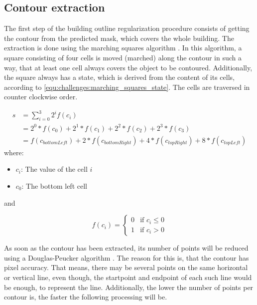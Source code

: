 \subsection{Contour extraction}
The first step of the building outline regularization procedure consists of getting the contour from the predicted mask, which covers the whole building. The extraction is done using the marching squares algorithm \cite{Maple.2003}. In this algorithm, a square consisting of four cells is moved (marched) along the contour in such a way, that at least one cell always covers the object to be contoured. Additionally, the square always has a state, which is derived from the content of its cells, according to \eqref{equ:challenges:marching_squares_state}. The cells are traversed in counter clockwise order.

\newenvironment{conditions}
  {\par\vspace{\abovedisplayskip}\noindent\begin{tabular}{>{$}l<{$} @{${}={}$} l}}
  {\end{tabular}\par\vspace{\belowdisplayskip}}

\begin{equation}
\begin{split}
	s	&= \displaystyle\sum_{i=0}^3 2^i f(c_i) \\
		&= 2^0 * f(c_0) + 2^1 * f(c_1) + 2^2 * f(c_2) + 2^3 * f(c_3) \\
		&= f(c_{bottomLeft}) + 2 * f(c_{bottomRight}) + 4 * f(c_{topRight}) + 8 * f(c_{topLeft})
	\label{equ:challenges:marching_squares_state}
\end{split}
\end{equation}
where:
\begin{itemize}[label=]
    \item $c_i$: The value of the cell $i$
    \item $c_0$: The bottom left cell
\end{itemize}

and

\[ f(c_i) =
  \begin{cases}
    0  & \text{if $c_i \leq 0$}\\
    1  & \text{if $c_i > 0$}
  \end{cases}
\]


As soon as the contour has been extracted, its number of points will be reduced using a Douglas-Peucker algorithm \cite{Douglas.1973}. The reason for this is, that the contour has pixel accuracy. That means, there may be several points on the same horizontal or vertical line, even though, the startpoint and endpoint of each such line would be enough, to represent the line. Additionally, the lower the number of points per contour is, the faster the following processing will be.

